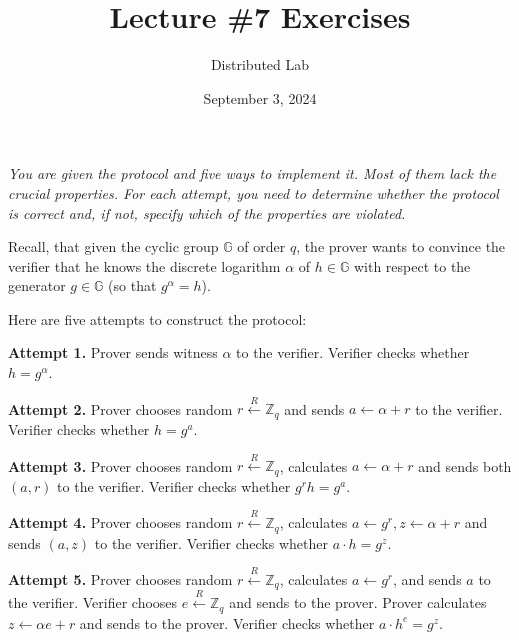 \documentclass{zkdl-tests-template}
\title{\huge\sffamily\bfseries Lecture \#7 Exercises}
\author{\Large\sffamily Distributed Lab}
\date{\sffamily September 3, 2024}
\begin{document}
\pagestyle{fancy}

\maketitle

\begin{tcolorbox}[colback=gray!10!white,fonttitle=\bfseries,colframe=purple!80!black,title=Exercises 1-5. Schnorr's Identification Protocol: ]
    \textit{You are given the protocol and five ways to implement it. Most of them lack the crucial properties. For each attempt, you need to determine whether the protocol is correct and, if not, specify which of the properties are violated.}
    \vspace{10px}
 
    Recall, that given the cyclic group $\mathbb{G}$ of order $q$, the prover wants to convince the verifier that he knows the discrete logarithm $\alpha$ of $h \in \mathbb{G}$ with respect to the generator $g \in \mathbb{G}$ (so that $g^{\alpha}=h$).

    Here are five attempts to construct the protocol:

    \textcolor{purple!80!black}{\textbf{Attempt 1.}} Prover sends witness $\alpha$ to the verifier. Verifier checks whether $h = g^{\alpha}$.

    \textcolor{purple!80!black}{\textbf{Attempt 2.}} Prover chooses random $r \xleftarrow{R} \mathbb{Z}_q$ and sends $a \gets \alpha + r$ to the verifier. Verifier checks whether $h = g^a$.

    \textcolor{purple!80!black}{\textbf{Attempt 3.}} Prover chooses random $r \xleftarrow{R} \mathbb{Z}_q$, calculates $a \gets \alpha + r$ and sends both $(a,r)$ to the verifier. Verifier checks whether $g^r h = g^a$.

    \textcolor{purple!80!black}{\textbf{Attempt 4.}} Prover chooses random $r \xleftarrow{R} \mathbb{Z}_q$, calculates $a \gets g^r, z \gets \alpha+r$ and sends $(a,z)$ to the verifier. Verifier checks whether $a \cdot h = g^z$.

    \textcolor{purple!80!black}{\textbf{Attempt 5.}} Prover chooses random $r \xleftarrow{R} \mathbb{Z}_q$, calculates $a \gets g^r$, and sends $a$ to the verifier. Verifier chooses $e \xleftarrow{R} \mathbb{Z}_q$ and sends to the prover. Prover calculates $z \gets \alpha e + r$ and sends to the prover. Verifier checks whether $a \cdot h^e = g^z$.

    \vspace{10px}


\end{tcolorbox}
\end{document}
